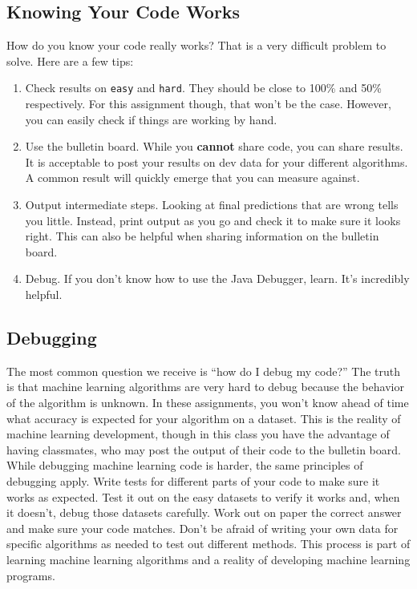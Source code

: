 \documentclass[11pt]{article}
\begin{document}
\subsection{Knowing Your Code Works}
How do you know your code really works? That is a very difficult problem to solve. Here are a few tips:
\begin{enumerate}
\item Check results on {\tt easy} and {\tt hard}. They should be close to 100\% and 50\% respectively. For this assignment though, that won't be the case. However, you can easily check if things are working by hand.
\item Use the bulletin board. While you {\bf cannot} share code, you can share results. It is acceptable to post your results on dev data for your different algorithms. A common result will quickly emerge that you can measure against.
\item Output intermediate steps. Looking at final predictions that are wrong tells you little. Instead, print output as you go and check it to make sure it looks right. This can also be helpful when sharing information on the bulletin board.
\item Debug. If you don't know how to use the Java Debugger, learn. It's incredibly helpful.
\end{enumerate}

\subsection{Debugging}
The most common question we receive is ``how do I debug my code?'' The truth is that machine learning algorithms are very hard to debug because
the behavior of the algorithm is unknown. In these assignments, you won't know ahead of time what accuracy is expected for your algorithm on a dataset.
This is the reality of machine learning development, though in this class you have the advantage of having classmates, who may post the output of their code to the
bulletin board. While debugging machine learning code is harder, the same principles of debugging apply. Write tests for different parts of your code
to make sure it works as expected. Test it out on the easy datasets to verify it works and, when it doesn't, debug those datasets carefully. Work out on paper
the correct answer and make sure your code matches. Don't be afraid of writing your own data for specific algorithms as needed to test out different methods.
This process is part of learning machine learning algorithms and a reality of developing machine learning programs.
\end{document}
